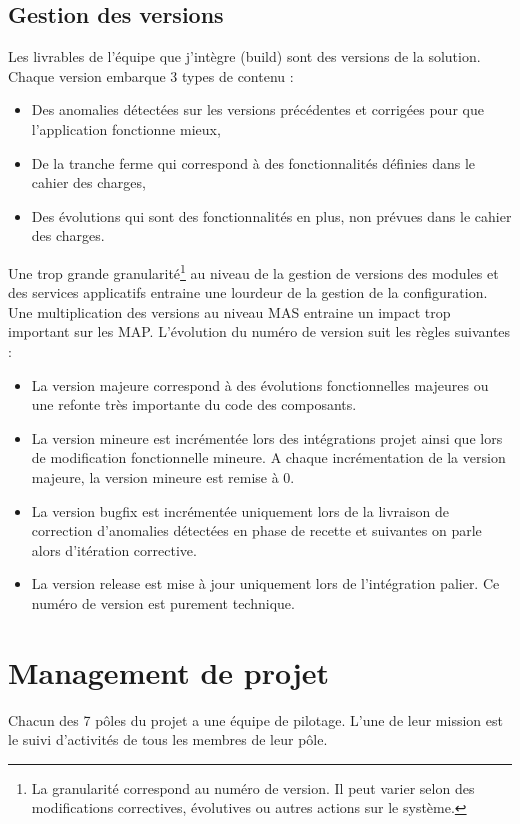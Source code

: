 \documentclass[12pt,a4paper]{article}
\begin{document}
\subsection{Gestion des versions}
Les livrables de l'équipe que j'intègre (build) sont des versions de la solution. Chaque version embarque 3 types de contenu :
\begin{itemize}
\item Des anomalies détectées sur les versions précédentes et corrigées pour que l’application fonctionne mieux,
\item De la tranche ferme qui correspond à des fonctionnalités définies dans le cahier des charges,
\item Des évolutions qui sont des fonctionnalités en plus, non prévues dans le cahier des charges.
\end{itemize}
Une trop grande granularité\footnote{La granularité correspond au numéro de version. Il peut varier selon des modifications correctives, évolutives ou autres actions sur le système.} au niveau de la gestion de versions des modules et des services applicatifs entraine une lourdeur de la gestion de la configuration. Une multiplication des versions au niveau MAS entraine un impact trop important sur les MAP.
L’évolution du numéro de version suit les règles suivantes :
\begin{itemize}
\item	La version majeure correspond à des évolutions fonctionnelles majeures ou une refonte très importante du code des composants.
\item	La version mineure est incrémentée lors des intégrations projet ainsi que lors de modification fonctionnelle mineure. A chaque incrémentation de la version majeure, la version mineure est remise à 0. 
\item	La version bugfix est incrémentée uniquement lors de la livraison de correction d’anomalies détectées en phase de recette et suivantes on parle alors d'itération corrective.
\item	La version release est mise à jour uniquement lors de l’intégration palier. Ce numéro de version est purement technique.
\end{itemize}
\clearpage
\newpage
\section{Management de projet}
Chacun des 7 pôles du projet a une équipe de pilotage. L'une de leur mission est le suivi d'activités de tous les membres de leur pôle. 
\end{document}
